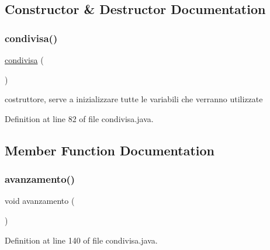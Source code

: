 \subsection{Constructor \& Destructor Documentation}
\mbox{\label{classcargame_1_1condivisa_a96b9f2e5620278c04a6c027b23b67dc3}} 
\subsubsection{\texorpdfstring{condivisa()}{condivisa()}}
{\footnotesize\ttfamily \hyperlink{classcargame_1_1condivisa}{condivisa} (\begin{DoxyParamCaption}{ }\end{DoxyParamCaption})}



costruttore, serve a inizializzare tutte le variabili che verranno utilizzate 



Definition at line 82 of file condivisa.\+java.



\subsection{Member Function Documentation}
\mbox{\label{classcargame_1_1condivisa_a93b971884ca2e884143dbb35744cb6f0}} 
\subsubsection{\texorpdfstring{avanzamento()}{avanzamento()}}
{\footnotesize\ttfamily void avanzamento (\begin{DoxyParamCaption}{ }\end{DoxyParamCaption})}



Definition at line 140 of file condivisa.\+java.

